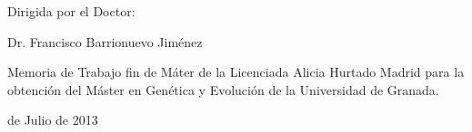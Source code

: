 \documentclass[a4paper,twoside,12pt]{book}
\begin{document}
\begin{minipage}[t]{.35\textwidth}
Dirigida por el Doctor:

\vspace{15ex}

Dr. Francisco Barrionuevo Jiménez 

\end{minipage}
\hfill
\begin{minipage}[t]{.5\textwidth}
Memoria de Trabajo fin de Máter de la Licenciada Alicia Hurtado Madrid para la obtención del Máster en Genética y Evolución de la Universidad de Granada.

\vspace{29.7ex}

 de Julio de 2013

\end{minipage}


\newpage
\cleardoublepage
\thispagestyle{empty}
\end{document}
